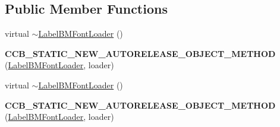 \subsection*{Public Member Functions}
\begin{DoxyCompactItemize}
\item 
virtual \hyperlink{classcocosbuilder_1_1LabelBMFontLoader_a59fe695d66bffcd8434e0c6b2051bb48}{$\sim$\+Label\+B\+M\+Font\+Loader} ()
\item 
\mbox{\label{classcocosbuilder_1_1LabelBMFontLoader_aefb6ea9d6c161b01ed126c371843673d}} 
{\bfseries C\+C\+B\+\_\+\+S\+T\+A\+T\+I\+C\+\_\+\+N\+E\+W\+\_\+\+A\+U\+T\+O\+R\+E\+L\+E\+A\+S\+E\+\_\+\+O\+B\+J\+E\+C\+T\+\_\+\+M\+E\+T\+H\+OD} (\hyperlink{classcocosbuilder_1_1LabelBMFontLoader}{Label\+B\+M\+Font\+Loader}, loader)
\item 
virtual \hyperlink{classcocosbuilder_1_1LabelBMFontLoader_a59fe695d66bffcd8434e0c6b2051bb48}{$\sim$\+Label\+B\+M\+Font\+Loader} ()
\item 
\mbox{\label{classcocosbuilder_1_1LabelBMFontLoader_aefb6ea9d6c161b01ed126c371843673d}} 
{\bfseries C\+C\+B\+\_\+\+S\+T\+A\+T\+I\+C\+\_\+\+N\+E\+W\+\_\+\+A\+U\+T\+O\+R\+E\+L\+E\+A\+S\+E\+\_\+\+O\+B\+J\+E\+C\+T\+\_\+\+M\+E\+T\+H\+OD} (\hyperlink{classcocosbuilder_1_1LabelBMFontLoader}{Label\+B\+M\+Font\+Loader}, loader)
\end{DoxyCompactItemize}
